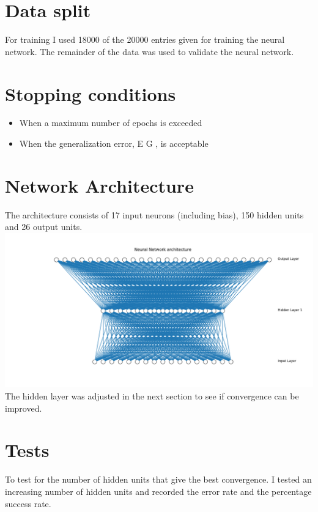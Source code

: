 \documentclass[11pt]{article}
\makeatletter
\def\maxwidth{\ifdim\Gin@nat@width>\linewidth\linewidth
    \else\Gin@nat@width\fi}
\let\Oldincludegraphics\includegraphics
\renewcommand{\includegraphics}[1]{\Oldincludegraphics[width=.8\maxwidth]{#1}}
\providecommand{\tightlist}{%
      \setlength{\itemsep}{0pt}\setlength{\parskip}{0pt}}
\makeatother
\begin{document}
    \hypertarget{data-split}{%
\section{Data split}\label{data-split}}

For training I used 18000 of the 20000 entries given for training the
neural network. The remainder of the data was used to validate the
neural network.

\hypertarget{stopping-conditions}{%
\section{Stopping conditions}\label{stopping-conditions}}

\begin{itemize}
\tightlist
\item
  When a maximum number of epochs is exceeded
\item
  When the generalization error, E G , is acceptable
\end{itemize}

\hypertarget{network-architecture}{%
\section{Network Architecture}\label{network-architecture}}

The architecture consists of 17 input neurons (including bias), 150
hidden units and 26 output units. \includegraphics{Experiment3NN.png}
The hidden layer was adjusted in the next section to see if convergence
can be improved.

\hypertarget{tests}{%
\section{Tests}\label{tests}}

To test for the number of hidden units that give the best convergence. I
tested an increasing number of hidden units and recorded the error rate
and the percentage success rate.
\end{document}
